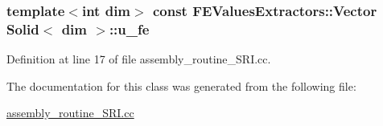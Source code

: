 \subsubsection[{\texorpdfstring{u\+\_\+fe}{u_fe}}]{\setlength{\rightskip}{0pt plus 5cm}template$<$int dim$>$ const F\+E\+Values\+Extractors\+::\+Vector {\bf Solid}$<$ dim $>$\+::u\+\_\+fe\hspace{0.3cm}{\ttfamily [private]}}\hypertarget{classSolid_a4de5ae991dbf3dcb928d0e40b9eae6dd}{}\label{classSolid_a4de5ae991dbf3dcb928d0e40b9eae6dd}


Definition at line 17 of file assembly\+\_\+routine\+\_\+\+S\+R\+I.\+cc.



The documentation for this class was generated from the following file\+:\begin{DoxyCompactItemize}
\item 
\hyperlink{assembly__routine__SRI_8cc}{assembly\+\_\+routine\+\_\+\+S\+R\+I.\+cc}\end{DoxyCompactItemize}
